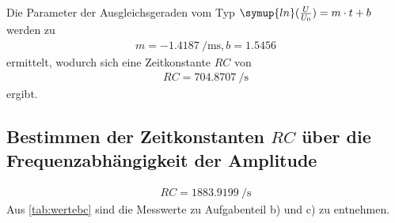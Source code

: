 Die Parameter der Ausgleichsgeraden vom Typ $\symup{ln}(\frac{U}{U_{0}}) = m \cdot t + b$ werden zu
\begin{align*}
    m = \SI{-1.4187}{\per\milli\second},
    b = 1.5456
\end{align*}
ermittelt, wodurch sich eine Zeitkonstante $RC$ von 
\begin{align*}
    RC = \SI{704.8707}{\per\second}
\end{align*}
ergibt.

\subsection{Bestimmen der Zeitkonstanten $RC$ über die Frequenzabhängigkeit der Amplitude}




\begin{align*}
    RC = \SI{1883.9199}{\per\second}
\end{align*}
Aus \autoref{tab:wertebc} sind die Messwerte zu Aufgabenteil b) und c) zu entnehmen.
